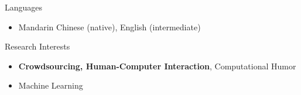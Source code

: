 \documentclass[margin]{main}
\begin{document}
\begin{resume}
Languages
\begin{itemize} \itemsep -2pt
    \item[] Mandarin Chinese (native), English (intermediate)
\end{itemize}

Research Interests
\begin{itemize} \itemsep -2pt
    \item[] {\bf Crowdsourcing, Human-Computer Interaction}, Computational Humor
    \item[] Machine Learning
\end{itemize}

\end{resume}
\end{document}
